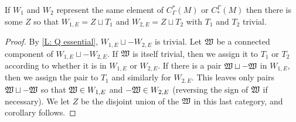 \begin{corollary}\label{C: Q essential}
If $W_1$ and $W_2$ represent the same element of $C^*_\Gamma(M)$ or $C_*^\Gamma(M)$ then there is some $Z$ so that $W_{1,E} = Z \sqcup T_1$ and $W_{2,E} = Z \sqcup T_2$ with $T_1$ and $T_2$ trivial.
\end{corollary}
\begin{proof}
By \cref{L: Q essential}, $W_{1,E} \sqcup -W_{2,E}$ is trivial. Let $\mathfrak W$ be a connected component of $W_{1,E} \sqcup -W_{2,E}$. If $\mathfrak W$ is itself trivial, then we assign it to $T_1$ or $T_2$ according to whether it is in $W_{1,E}$ or $W_{2,E}$. If there is a pair $\mathfrak W \sqcup -\mathfrak W$ in $W_{1,E}$, then we assign the pair to $T_1$ and similarly for $W_{2,E}$. This leaves only pairs $\mathfrak W \sqcup -\mathfrak W$ so that $\mathfrak W \in W_{1,E}$ and $-\mathfrak W \in W_{2,E}$ (reversing the sign of $\mathfrak W$ if necessary). We let $Z$ be the disjoint union of the $\mathfrak W$ in this last category, and corollary follows.
\end{proof}

